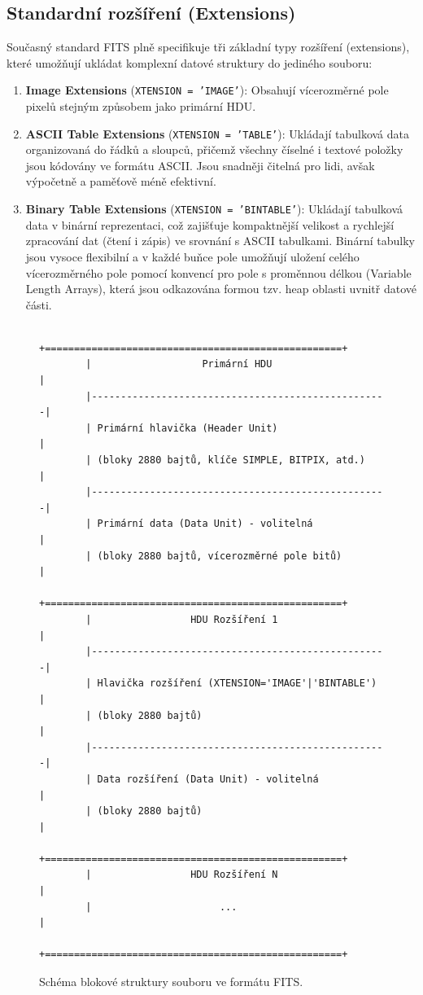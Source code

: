 \subsection{Standardní rozšíření (Extensions)} Současný standard \ac{FITS} plně specifikuje tři základní typy rozšíření (extensions), které umožňují ukládat komplexní datové struktury do jediného souboru: \begin{enumerate} \item \textbf{Image Extensions} (\texttt{XTENSION = 'IMAGE'}): Obsahují vícerozměrné pole pixelů stejným způsobem jako primární \ac{HDU}. \item \textbf{ASCII Table Extensions} (\texttt{XTENSION = 'TABLE'}): Ukládají tabulková data organizovaná do řádků a sloupců, přičemž všechny číselné i textové položky jsou kódovány ve formátu ASCII. Jsou snadněji čitelná pro lidi, avšak výpočetně a paměťově méně efektivní. \item \textbf{Binary Table Extensions} (\texttt{XTENSION = 'BINTABLE'}): Ukládají tabulková data v binární reprezentaci, což zajišťuje kompaktnější velikost a rychlejší zpracování dat (čtení i zápis) ve srovnání s ASCII tabulkami. Binární tabulky jsou vysoce flexibilní a v každé buňce pole umožňují uložení celého vícerozměrného pole pomocí konvencí pro pole s proměnnou délkou (Variable Length Arrays), která jsou odkazována formou tzv. heap oblasti uvnitř datové části. \end{enumerate}
\begin{figure}[htbp] 
    \centering 
    \begin{verbatim} 
        +===================================================+ 
        |                   Primární HDU                    | 
        |---------------------------------------------------| 
        | Primární hlavička (Header Unit)                   | 
        | (bloky 2880 bajtů, klíče SIMPLE, BITPIX, atd.)    | 
        |---------------------------------------------------| 
        | Primární data (Data Unit) - volitelná             | 
        | (bloky 2880 bajtů, vícerozměrné pole bitů)        | 
        +===================================================+ 
        |                 HDU Rozšíření 1                   | 
        |---------------------------------------------------| 
        | Hlavička rozšíření (XTENSION='IMAGE'|'BINTABLE')  | 
        | (bloky 2880 bajtů)                                | 
        |---------------------------------------------------| 
        | Data rozšíření (Data Unit) - volitelná            | 
        | (bloky 2880 bajtů)                                | 
        +===================================================+ 
        |                 HDU Rozšíření N                   | 
        |                      ...                          | 
        +===================================================+ 
    \end{verbatim} 
    \caption{Schéma blokové struktury souboru ve formátu FITS.} 
    \label{fig:fits_structure} 
\end{figure}